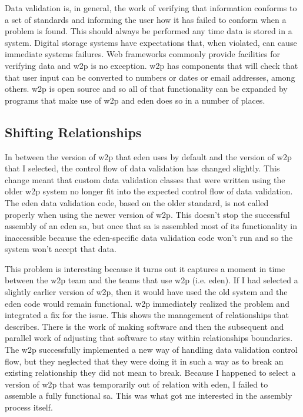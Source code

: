 \documentclass[a4paper,man,natbib,floatsintext]{apa6}
\begin{document}
   Data validation is, in general, the work of verifying that information conforms to a set of standards and informing the user how it has failed to conform when a problem is found. This should always be performed any time data is stored in a system. Digital storage systems have expectations that, when violated, can cause immediate systems failures. Web frameworks commonly provide facilities for verifying data and \gls{w2p} is no exception. \Gls{w2p} has components that will check that that user input can be converted to numbers or dates or email addresses, among others. \Gls{w2p} is open source and so all of that functionality can be expanded by programs that make use of \gls{w2p} and \acrshort{eden} does so in a number of places.

   \subsection{Shifting Relationships}
   In between the version of \gls{w2p} that \acrshort{eden} uses by default and the version of \gls{w2p} that I selected, the control flow of data validation has changed slightly. This change meant that custom data validation classes that were written using the older \gls{w2p} system no longer fit into the expected control flow of data validation. The \acrshort{eden} data validation code, based on the older standard, is not called properly when using the newer version of \gls{w2p}. This doesn't stop the successful assembly of an \acrshort{eden} \gls{sa}, but once that \gls{sa} is assembled most of its functionality in inaccessible because the \acrshort{eden}-specific data validation code won't run and so the system won't accept that data. 

   This problem is interesting because it turns out it captures a moment in time between the \gls{w2p} team and the teams that use \gls{w2p} (i.e. \acrshort{eden}). If I had selected a slightly earlier version of \gls{w2p}, then it would have used the old system and the \acrshort{eden} code would remain functional. \gls{w2p} immediately realized the problem and integrated a fix for the issue. This shows the management of relationships that \citet{Mackenzie2006-hb} describes. There is the work of making software and then the subsequent and parallel work of adjusting that software to stay within relationships boundaries. The \gls{w2p} successfully implemented a new way of handling data validation control flow, but they neglected that they were doing it in such a way as to break an existing relationship they did not mean to break. Because I happened to select a version of \gls{w2p} that was temporarily out of relation with \acrshort{eden}, I failed to assemble a fully functional \gls{sa}. This was what got me interested in the assembly process itself.
\end{document}

